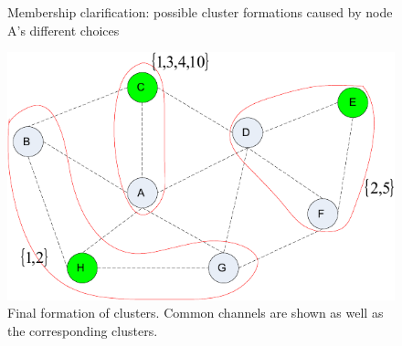 \documentclass[times]{ettauth}
\theoremstyle{mytheoremstyle}
\theoremstyle{mytheoremstyle}
\theoremstyle{mytheoremstyle}
\begin{document}


\begin{figure}[h]
\centering
{}
\hspace{.15 in}
\caption[]{Membership clarification: possible cluster formations caused by node A's different choices} %
\label{fig3}
\end{figure}


\begin{figure}[h]
  \centering
  \includegraphics[width=0.5\linewidth]{final_clustering_ross.pdf}
  \caption{Final formation of clusters. Common channels are shown as well as the corresponding clusters.}
  \label{final_clustering_ross}
\end{figure}
\end{document}
